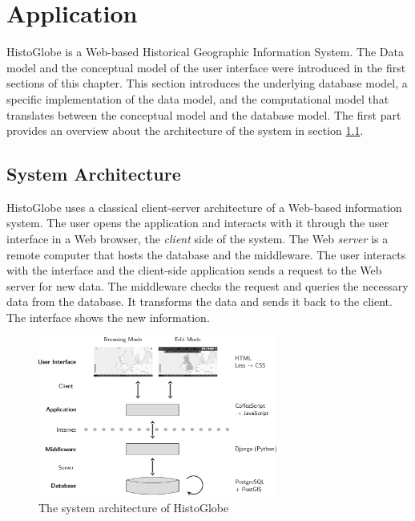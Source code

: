 
\section{Application} %
\label{sec:application}

HistoGlobe is a Web-based Historical Geographic Information System. The Data model and the conceptual model of the user interface were introduced in the first sections of this chapter. This section introduces the underlying database model, a specific implementation of the data model, and the computational model that translates between the conceptual model and the database model. The first part provides an overview about the architecture of the system in section \ref{sub:system_architecture}.

\subsection{System Architecture} %
\label{sub:system_architecture}

HistoGlobe uses a classical client-server architecture of a Web-based information system. The user opens the application and interacts with it through the user interface in a Web browser, the \emph{client} side of the system. The Web \emph{server} is a remote computer that hosts the database and the middleware. The user interacts with the interface and the client-side application sends a request to the Web server for new data. The middleware checks the request and queries the necessary data from the database. It transforms the data and sends it back to the client. The interface shows the new information.

\begin{figure}[H]
  \vspace{1em}
  \centering
  \includegraphics[width=0.7\textwidth]{graphics/development/application/system_architecture}
  \caption{The system architecture of HistoGlobe}
  \label{fig:system_architecture}
\end{figure}


